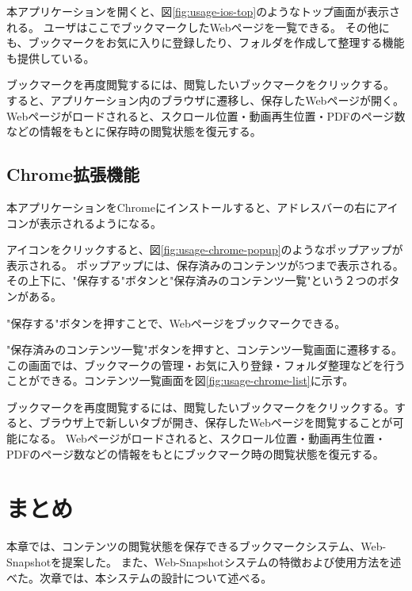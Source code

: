 本アプリケーションを開くと、図\ref{fig:usage-ios-top}のようなトップ画面が表示される。
ユーザはここでブックマークしたWebページを一覧できる。
その他にも、ブックマークをお気に入りに登録したり、フォルダを作成して整理する機能も提供している。

ブックマークを再度閲覧するには、閲覧したいブックマークをクリックする。
すると、アプリケーション内のブラウザに遷移し、保存したWebページが開く。
Webページがロードされると、スクロール位置・動画再生位置・PDFのページ数などの情報をもとに保存時の閲覧状態を復元する。

\subsection{Chrome拡張機能}
本アプリケーションをChromeにインストールすると、アドレスバーの右にアイコンが表示されるようになる。

アイコンをクリックすると、図\ref{fig:usage-chrome-popup}のようなポップアップが表示される。
ポップアップには、保存済みのコンテンツが5つまで表示される。
その上下に、"保存する"ボタンと"保存済みのコンテンツ一覧"という２つのボタンがある。

"保存する"ボタンを押すことで、Webページをブックマークできる。



"保存済みのコンテンツ一覧"ボタンを押すと、コンテンツ一覧画面に遷移する。
この画面では、ブックマークの管理・お気に入り登録・フォルダ整理などを行うことができる。コンテンツ一覧画面を図\ref{fig:usage-chrome-list}に示す。



ブックマークを再度閲覧するには、閲覧したいブックマークをクリックする。すると、ブラウザ上で新しいタブが開き、保存したWebページを閲覧することが可能になる。
Webページがロードされると、スクロール位置・動画再生位置・PDFのページ数などの情報をもとにブックマーク時の閲覧状態を復元する。

\section{まとめ}
本章では、コンテンツの閲覧状態を保存できるブックマークシステム、Web-Snapshotを提案した。
また、Web-Snapshotシステムの特徴および使用方法を述べた。次章では、本システムの設計について述べる。

